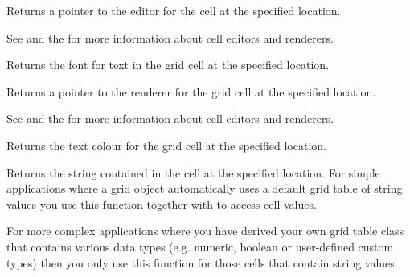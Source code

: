 Returns a pointer to the editor for the cell at the specified location.

See  and
the  for more information about cell editors and renderers.



\label{wxgridgetcellfont}


Returns the font for text in the grid cell at the specified location.



\label{wxgridgetcellrenderer}


Returns a pointer to the renderer for the grid cell at the specified location.

See  and
the  for more information about cell editors and renderers.



\label{wxgridgetcelltextcolour}


Returns the text colour for the grid cell at the specified location.



\label{wxgridgetcellvalue}



Returns the string contained in the cell at the specified location. For simple applications where a
grid object automatically uses a default grid table of string values you use this function together
with  to access cell values.

For more complex applications where you have derived your own grid table class that contains
various data types (e.g. numeric, boolean or user-defined custom types) then you only use this
function for those cells that contain string values.

